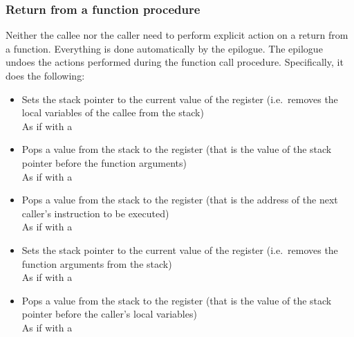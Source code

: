 \hypertarget{functions:return}{
	\subsubsection{Return from a function procedure}
}

\vspace{-0.2cm}

Neither the callee nor the caller need to perform explicit action
on a return from a function.
Everything is done automatically by the epilogue.
The epilogue undoes the actions performed during the function call procedure.
Specifically, it does the following:

\begin{itemize}
    \item Sets the stack pointer to the current value of the  register
    (i.e.\ removes the local variables of the callee from the stack) \\
    As if with a \hspace{-0.1cm}

    \item Pops a value from the stack to the  register
    (that is the value of the stack pointer before the function arguments) \\
    As if with a \hspace{-0.1cm}

    \item Pops a value from the stack to the  register
    (that is the address of the next caller's instruction to be executed) \\
    As if with a \hspace{-0.1cm}

    \item Sets the stack pointer to the current value of the  register
    (i.e.\ removes the function arguments from the stack) \\
    As if with a \hspace{-0.1cm}

    \item Pops a value from the stack to the  register
    (that is the value of the stack pointer before the caller's local
    variables) \\
    As if with a \hspace{-0.1cm}
\end{itemize}
